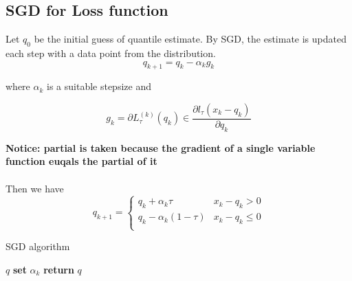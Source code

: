 \subsection{SGD for Loss function}

Let $q_0$ be the initial guess of quantile estimate. 
By SGD, the estimate is updated each step with a data point from the distribution.
\begin{equation}
    q_{k+1} = q_k - \alpha_k g_k
\end{equation}

where $ \alpha_k $ is a suitable stepsize and 

\begin{equation}
    g_k = \partial L_{\tau}^{(k)}(q_k) \in \frac{\partial l_\tau(x_k - q_k)}{\partial q_k}
\end{equation}
 
\textbf{Notice: partial is taken because the gradient of a single variable function
euqals the partial of it}
\\\\
Then we have
\begin{equation*}
    q_{k+1} = 
    \begin{cases}
        q_k + \alpha_k \tau               & x_k - q_k > 0\\
        q_k - \alpha_k (1-\tau)           & x_k - q_k \leq 0\\
    \end{cases}
\end{equation*}


\begin{algorithm}
    \caption{SGD algorithm}\label{alg:SGD}
    \begin{algorithmic}[1]
         $q$                 
                              
                \State \textbf{set} $\alpha_k$  
                                  
                \Else                           {}
                \EndIf
            \EndFor
        \State \textbf{return} $q$              
    \end{algorithmic}
\end{algorithm}
